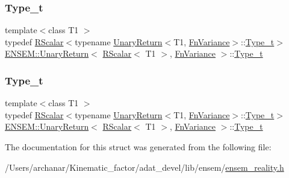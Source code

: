 \subsubsection{\texorpdfstring{Type\_t}{Type\_t}\hspace{0.1cm}{\footnotesize\ttfamily [1/2]}}
{\footnotesize\ttfamily template$<$class T1 $>$ \\
typedef \mbox{\hyperlink{classENSEM_1_1RScalar}{R\+Scalar}}$<$typename \mbox{\hyperlink{structENSEM_1_1UnaryReturn}{Unary\+Return}}$<$T1, \mbox{\hyperlink{structENSEM_1_1FnVariance}{Fn\+Variance}}$>$\+::\mbox{\hyperlink{structENSEM_1_1UnaryReturn_3_01RScalar_3_01T1_01_4_00_01FnVariance_01_4_aadaa55c2cab1c15c97829d8d0a69b228}{Type\+\_\+t}}$>$ \mbox{\hyperlink{structENSEM_1_1UnaryReturn}{E\+N\+S\+E\+M\+::\+Unary\+Return}}$<$ \mbox{\hyperlink{classENSEM_1_1RScalar}{R\+Scalar}}$<$ T1 $>$, \mbox{\hyperlink{structENSEM_1_1FnVariance}{Fn\+Variance}} $>$\+::\mbox{\hyperlink{structENSEM_1_1UnaryReturn_3_01RScalar_3_01T1_01_4_00_01FnVariance_01_4_aadaa55c2cab1c15c97829d8d0a69b228}{Type\+\_\+t}}}

\mbox{\label{structENSEM_1_1UnaryReturn_3_01RScalar_3_01T1_01_4_00_01FnVariance_01_4_aadaa55c2cab1c15c97829d8d0a69b228}} 
\subsubsection{\texorpdfstring{Type\_t}{Type\_t}\hspace{0.1cm}{\footnotesize\ttfamily [2/2]}}
{\footnotesize\ttfamily template$<$class T1 $>$ \\
typedef \mbox{\hyperlink{classENSEM_1_1RScalar}{R\+Scalar}}$<$typename \mbox{\hyperlink{structENSEM_1_1UnaryReturn}{Unary\+Return}}$<$T1, \mbox{\hyperlink{structENSEM_1_1FnVariance}{Fn\+Variance}}$>$\+::\mbox{\hyperlink{structENSEM_1_1UnaryReturn_3_01RScalar_3_01T1_01_4_00_01FnVariance_01_4_aadaa55c2cab1c15c97829d8d0a69b228}{Type\+\_\+t}}$>$ \mbox{\hyperlink{structENSEM_1_1UnaryReturn}{E\+N\+S\+E\+M\+::\+Unary\+Return}}$<$ \mbox{\hyperlink{classENSEM_1_1RScalar}{R\+Scalar}}$<$ T1 $>$, \mbox{\hyperlink{structENSEM_1_1FnVariance}{Fn\+Variance}} $>$\+::\mbox{\hyperlink{structENSEM_1_1UnaryReturn_3_01RScalar_3_01T1_01_4_00_01FnVariance_01_4_aadaa55c2cab1c15c97829d8d0a69b228}{Type\+\_\+t}}}



The documentation for this struct was generated from the following file\+:\begin{DoxyCompactItemize}
\item 
/\+Users/archanar/\+Kinematic\+\_\+factor/adat\+\_\+devel/lib/ensem/\mbox{\hyperlink{lib_2ensem_2ensem__reality_8h}{ensem\+\_\+reality.\+h}}\end{DoxyCompactItemize}
